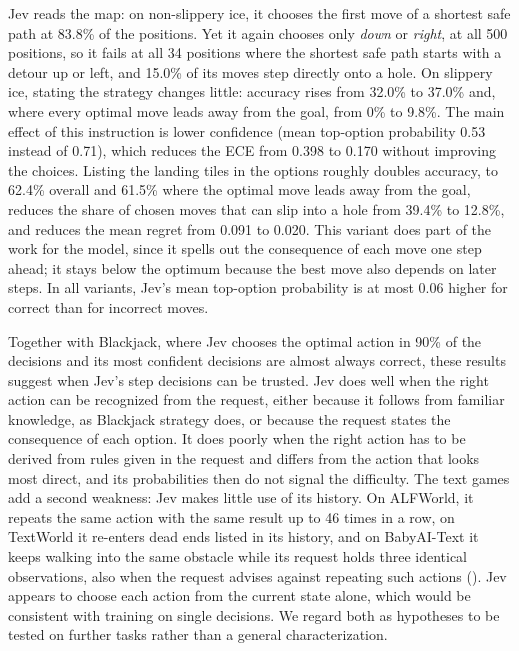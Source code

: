 \documentclass[table]{article}
\begin{document}
\begin{table}[h]
\centering
\caption{Jev's moves at 500 fixed FrozenLake positions under four variants of the request. Acc.: share of positions where Jev chooses an optimal move; Away: the same on positions where every optimal move leads away from the goal ($n{=}174$; $n{=}34$ for the deterministic variant). $p_\text{opt}$: probability on the optimal moves. Top $p$: mean top-option probability for correct / incorrect choices. Risky: share of choices that can slip into a hole (deterministic: that step onto a hole). Regret: loss in probability of reaching the goal.}
\label{tab:frozenlake-probe}
\footnotesize
\setlength{\tabcolsep}{4pt}

\end{table}

Jev reads the map: on non-slippery ice, it chooses the first move of a shortest safe path at 83.8\% of the positions. Yet it again chooses only \emph{down} or \emph{right}, at all 500 positions, so it fails at all 34 positions where the shortest safe path starts with a detour up or left, and 15.0\% of its moves step directly onto a hole. On slippery ice, stating the strategy changes little: accuracy rises from 32.0\% to 37.0\% and, where every optimal move leads away from the goal, from 0\% to 9.8\%. The main effect of this instruction is lower confidence (mean top-option probability 0.53 instead of 0.71), which reduces the ECE from 0.398 to 0.170 without improving the choices. Listing the landing tiles in the options roughly doubles accuracy, to 62.4\% overall and 61.5\% where the optimal move leads away from the goal, reduces the share of chosen moves that can slip into a hole from 39.4\% to 12.8\%, and reduces the mean regret from 0.091 to 0.020. This variant does part of the work for the model, since it spells out the consequence of each move one step ahead; it stays below the optimum because the best move also depends on later steps. In all variants, Jev's mean top-option probability is at most 0.06 higher for correct than for incorrect moves.

Together with Blackjack, where Jev chooses the optimal action in 90\% of the decisions and its most confident decisions are almost always correct, these results suggest when Jev's step decisions can be trusted. Jev does well when the right action can be recognized from the request, either because it follows from familiar knowledge, as Blackjack strategy does, or because the request states the consequence of each option. It does poorly when the right action has to be derived from rules given in the request and differs from the action that looks most direct, and its probabilities then do not signal the difficulty. The text games add a second weakness: Jev makes little use of its history. On ALFWorld, it repeats the same action with the same result up to 46 times in a row, on TextWorld it re-enters dead ends listed in its history, and on BabyAI-Text it keeps walking into the same obstacle while its request holds three identical observations, also when the request advises against repeating such actions (). Jev appears to choose each action from the current state alone, which would be consistent with training on single decisions. We regard both as hypotheses to be tested on further tasks rather than a general characterization.
\end{document}
